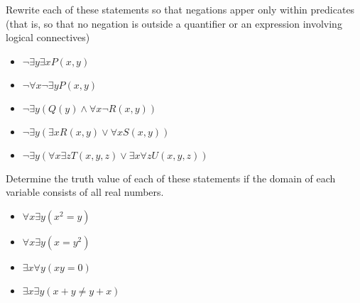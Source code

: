 \documentclass{article}
\newenvironment{problem}[2][Problem]{\begin{trivlist}
\item[\hskip \labelsep {\bfseries #1}\hskip \labelsep {\bfseries #2.}]}{\end{trivlist}}
\begin{document}
\begin{problem}{17}
    Rewrite each of these statements so that negations apper only within predicates (that is, so that no negation is outside a quantifier or an expression involving logical connectives)
    \begin{itemize}
        \item[(a)] $\neg \exists y \exists x P(x,y)$
        \item[(b)] $\neg \forall x \neg \exists y P(x,y)$
        \item[(c)] $\neg \exists y(Q(y) \land \forall x \neg R(x, y))$
        \item[(d)] $\neg \exists y(\exists x R(x, y) \lor \forall x S(x, y))$
        \item[(e)] $\neg \exists y(\forall x \exists z T(x, y, z) \lor \exists x \forall z U(x, y, z))$
    \end{itemize}
    
\end{problem}

\begin{problem}{18}
    Determine the truth value of each of these statements if the domain of each variable consists of all real numbers.
    \begin{itemize}
        \item[(a)] $\forall x \exists y (x^2=y)$
        \item[(b)] $\forall x \exists y (x = y^2)$
        \item[(c)] $\exists x \forall y (xy=0) $
        \item[(d)] $\exists x \exists y (x + y \neq y + x) $  
    \end{itemize}

    
\end{problem}
\end{document}
